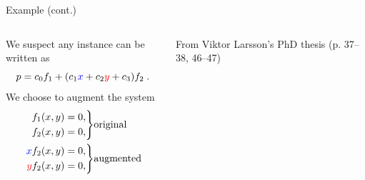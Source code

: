\documentclass[aspectratio=169]{beamer}
\begin{document}
\begin{frame}[t]{Example (cont.)}
\vspace{1cm}
\begin{columns}
    \begin{column}{0.7\textwidth}
        We suspect any instance can be written as
        \begin{equation*}
            p = c_0f_1 + (c_1{\color{blue}x}+c_2{\color{red}y}+c_3)f_2\;.
        \end{equation*}
        We choose to augment the system
        \begin{equation*}
            \begin{aligned}
            \left.
            \begin{aligned}
            f_1(x,y) & = 0, \\
            f_2(x,y) & = 0, \\
            \end{aligned}
            \right\}&\text{original}
            \\
            \left.
            \begin{aligned}
            {\color{blue}x}f_2(x,y) & = 0, \\
            {\color{red}y}f_2(x,y) & = 0, \\
            \end{aligned}
            \right\}&\text{augmented}
            \end{aligned}
        \end{equation*}
    \end{column}%
    \begin{column}{0.3\textwidth}
        \centering
        

        \vspace{5mm}

        {\scriptsize From Viktor Larsson's PhD thesis (p. 37--38, 46--47)}
    \end{column}
\end{columns}
\end{frame}
\end{document}
